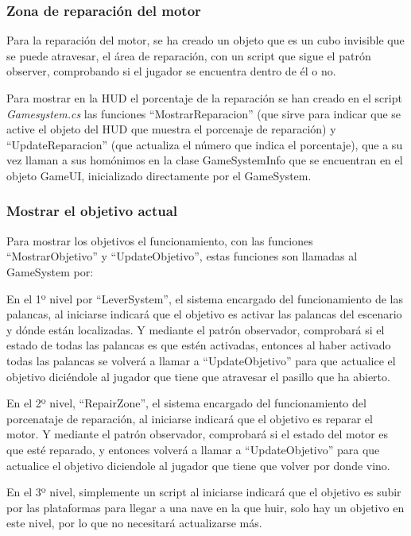 \subsubsection{Zona de reparación del motor}
Para la reparación del motor, se ha creado un objeto que es un cubo invisible que se puede atravesar, el área de reparación, con un script que sigue el patrón observer, comprobando si el jugador se encuentra dentro de él o no. 

Para mostrar en la HUD el porcentaje de la reparación se han creado en el script \textit{Gamesystem.cs} las funciones ``MostrarReparacion'' (que sirve para indicar que se active el objeto del HUD que muestra el porcenaje de reparación) y ``UpdateReparacion'' (que actualiza el número que indica el porcentaje), que a su vez llaman a sus homónimos en la clase GameSystemInfo que se encuentran en el objeto GameUI, inicializado directamente por el GameSystem. 

\subsubsection{Mostrar el objetivo actual}
Para mostrar los objetivos el funcionamiento, con las funciones ``MostrarObjetivo'' y ``UpdateObjetivo'', estas funciones son llamadas al GameSystem por: 

En el 1º nivel por ``LeverSystem'', el sistema encargado del funcionamiento de las palancas, al iniciarse indicará que el objetivo es activar las palancas del escenario y dónde están localizadas. Y mediante el patrón observador, comprobará si el estado de todas las palancas es que estén activadas, entonces al haber activado todas las palancas se volverá a llamar a ``UpdateObjetivo'' para que actualice el objetivo diciéndole al jugador que tiene que atravesar el pasillo que ha abierto. 

En el 2º nivel, ``RepairZone'', el sistema encargado del funcionamiento del porcenataje de reparación, al iniciarse indicará que el objetivo es reparar el motor. Y mediante el patrón observador, comprobará si el estado del motor es que esté reparado, y entonces volverá a llamar a ``UpdateObjetivo'' para que actualice el objetivo diciendole al jugador que tiene que volver por donde vino.

En el 3º nivel, simplemente un script al iniciarse indicará que el objetivo es subir por las plataformas para llegar a una nave en la que huir, solo hay un objetivo en este nivel, por lo que no necesitará actualizarse más.

